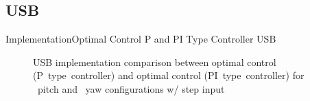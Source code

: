 \documentclass{beamer}
\begin{document}
\subsection{USB}
\begin{frame}{Implementation}{Optimal Control P and PI Type Controller USB}
    \begin{figure}
      \centering
      \caption{USB implementation comparison between optimal control (P~type~controller) and optimal control (PI~type~controller) for ~pitch and ~yaw configurations w/ step input}
      \label{fig:PvPI_USB}
    \end{figure}
\end{frame}
\end{document}
